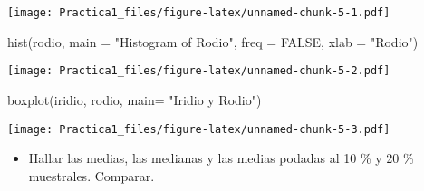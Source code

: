 \documentclass[
]{article}
\newenvironment{Shaded}{\begin{snugshade}}{\end{snugshade}}
\newcommand{\AttributeTok}[1]{\textcolor[rgb]{0.77,0.63,0.00}{#1}}
\newcommand{\ConstantTok}[1]{\textcolor[rgb]{0.00,0.00,0.00}{#1}}
\newcommand{\FunctionTok}[1]{\textcolor[rgb]{0.00,0.00,0.00}{#1}}
\newcommand{\NormalTok}[1]{#1}
\newcommand{\OtherTok}[1]{\textcolor[rgb]{0.56,0.35,0.01}{#1}}
\newcommand{\SpecialCharTok}[1]{\textcolor[rgb]{0.00,0.00,0.00}{#1}}
\newcommand{\StringTok}[1]{\textcolor[rgb]{0.31,0.60,0.02}{#1}}
\providecommand{\tightlist}{%
  \setlength{\itemsep}{0pt}\setlength{\parskip}{0pt}}
\begin{document}
\begin{Shaded}
\end{Shaded}

\texttt{[image: Practica1\_files/figure-latex/unnamed-chunk-5-1.pdf]}

\begin{Shaded}
\begin{Highlighting}[]
\FunctionTok{hist}\NormalTok{(rodio, }\AttributeTok{main =} \StringTok{"Histogram of Rodio"}\NormalTok{, }\AttributeTok{freq =} \ConstantTok{FALSE}\NormalTok{, }\AttributeTok{xlab =} \StringTok{"Rodio"}\NormalTok{)}
\end{Highlighting}
\end{Shaded}

\texttt{[image: Practica1\_files/figure-latex/unnamed-chunk-5-2.pdf]}

\begin{Shaded}
\begin{Highlighting}[]
\FunctionTok{boxplot}\NormalTok{(iridio, rodio, }\AttributeTok{main=} \StringTok{"Iridio y Rodio"}\NormalTok{)}
\end{Highlighting}
\end{Shaded}

\texttt{[image: Practica1\_files/figure-latex/unnamed-chunk-5-3.pdf]}

\begin{itemize}
\tightlist
\item
  Hallar las medias, las medianas y las medias podadas al 10 \% y 20 \%
  muestrales. Comparar.
\end{itemize}
\end{document}
